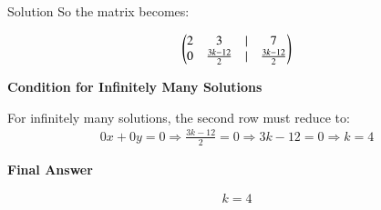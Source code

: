 \documentclass{beamer}
\begin{document}
\begin{frame}{Solution}
So the matrix becomes:

\begin{align}
\begin{pmatrix}2 & 3 & \vert & 7 \\
0 & \frac{3k - 12}{2} & \vert & \frac{3k - 12}{2}\end{pmatrix}
\end{align}


\textbf{Condition for Infinitely Many Solutions}

For infinitely many solutions, the second row must reduce to:
\begin{align}
0x + 0y = 0
\Rightarrow \frac{3k - 12}{2} = 0
\Rightarrow 3k - 12 = 0
\Rightarrow k = 4
\end{align}


\textbf{Final Answer}

\begin{align}
\boxed{k = 4}
\end{align}


\end{frame}
\end{document}
